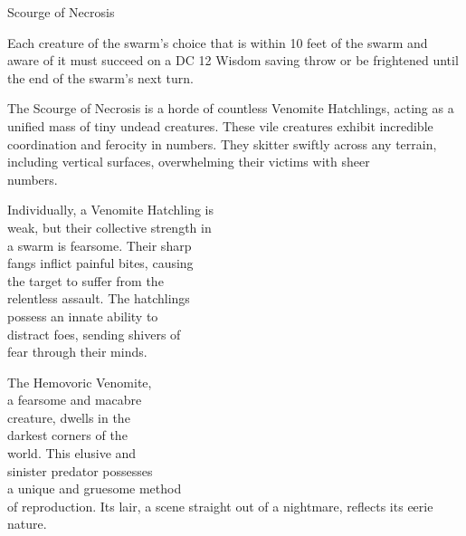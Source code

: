 \documentclass[letterpaper,openany,twoside,twocolumn]{book}
\begin{document}
\begin{DndMonster}[width=0.5\textwidth]{Scourge of Necrosis}
	\DndMonsterAttack[
      name=Bite,
      distance=melee, %
      mod=+5,
      reach=0,
      targets=one target,
      dmg=\DndDice{4d4},
      dmg-type=piercing,
      or-dmg=\DndDice{2d4},
      or-dmg-when={if the swarm has half of its hit points or fewer},
    ]
    
    Each creature of the swarm's choice that is within 10 feet of the swarm and aware of it must succeed on a DC 12 Wisdom saving throw or be frightened until the end of the swarm's next turn.
      
\end{DndMonster}

The Scourge of Necrosis is a horde of countless Venomite Hatchlings, acting as a unified mass of tiny undead creatures. These vile creatures exhibit incredible coordination and ferocity in numbers. They skitter swiftly across any terrain, including vertical surfaces, overwhelming their victims with sheer\\numbers.

Individually, a Venomite Hatchling is\\weak, but their collective strength in\\a swarm is fearsome. Their sharp\\fangs inflict painful bites, causing\\the target to suffer from the\\relentless assault. The hatchlings\\possess an innate ability to\\distract foes, sending shivers of\\fear through their minds.

\vfill\eject %


The Hemovoric Venomite,\\a fearsome and macabre\\creature, dwells in the\\darkest corners of the\\world. This elusive and\\sinister predator possesses\\a unique and gruesome method\\of reproduction. Its lair, a scene straight out of a nightmare, reflects its eerie nature.
\end{document}
